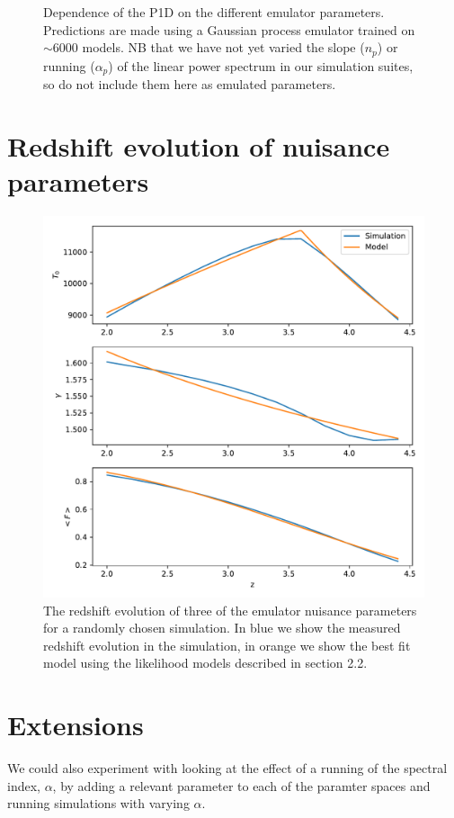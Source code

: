 \documentclass[]{article}
\begin{document}
\begin{figure}[h]
    \caption{Dependence of the P1D on the different emulator parameters. Predictions are 
    made using a Gaussian process emulator trained on $\sim6000$ models. NB that we have not 
    yet varied the slope ($n_p$) or running ($\alpha_p$) of the linear power spectrum in 
    our simulation suites, so do not include them here as emulated parameters.}
\end{figure}

\clearpage
\section{Redshift evolution of nuisance parameters}
\begin{figure}[h]
    \centering
    \includegraphics[scale=0.7]{Figures/512_sim2.pdf}
    \caption{The redshift evolution of three of the emulator nuisance parameters for a 
    randomly chosen simulation. In blue we show the measured redshift evolution in the 
    simulation, in orange we show the best fit model using the likelihood models 
    described in section 2.2.}
\end{figure}

\section{Extensions}
We could also experiment with looking at the effect of a running of the spectral index,
$\alpha$, by adding a relevant parameter to each of the paramter spaces and running simulations
with varying $\alpha$.
\end{document}
